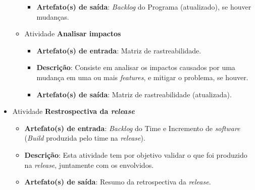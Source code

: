 \begin{itemize}
\begin{itemize}
\begin{itemize}
	      \item \textbf{Artefato(s) de saída}: \textit{Backlog} do Programa (atualizado), se houver mudanças.
		    
	    \end{itemize}
	    
	 \item Atividade \textbf{Analisar impactos}
	    
	    \begin{itemize}
	      \item \textbf{Artefato(s) de entrada}: Matriz de rastreabilidade.

	      \item \textbf{Descrição}: Consiste em analisar os impactos causados por uma mudança em uma ou mais
		\textit{features}, e mitigar o problema, se houver.
	      
	      \item \textbf{Artefato(s) de saída}: Matriz de rastreabilidade (atualizada).
		    
	    \end{itemize}
	    
	\end{itemize}
	
     \item Atividade \textbf{Restrospectiva da \textit{release}}
      
	  \begin{itemize}
	    \item \textbf{Artefato(s) de entrada}: \textit{Backlog} do Time e
	      Incremento de \textit{software} (\textit{Build} produzida pelo time na \textit{release}).
	    
	    \item \textbf{Descrição}: Esta atividade tem por objetivo validar o que foi produzido na \textit{release},
	      juntamente com os envolvidos.
	    
	    \item \textbf{Artefato(s) de saída}: Resumo da retrospectiva da \textit{release}.
		  
	  \end{itemize}
     
    \end{itemize}
    
    \vfill